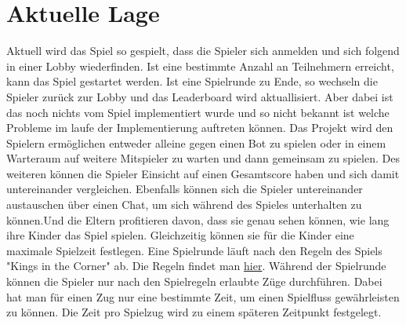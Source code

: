 \section{Aktuelle Lage}

Aktuell wird das Spiel so gespielt, dass die Spieler sich anmelden und sich folgend in einer Lobby wiederfinden. Ist eine bestimmte Anzahl an Teilnehmern erreicht, kann das Spiel gestartet werden. Ist eine Spielrunde zu Ende, so wechseln die Spieler zurück zur Lobby und das Leaderboard wird aktuallisiert. Aber dabei ist das noch nichts vom Spiel implementiert wurde und so nicht bekannt ist welche Probleme im laufe der Implementierung auftreten können. Das Projekt wird den Spielern ermöglichen entweder alleine gegen einen Bot zu spielen oder in einem Warteraum auf weitere Mitspieler zu warten und dann gemeinsam zu spielen. Des weiteren können die Spieler Einsicht auf einen Gesamtscore haben und sich damit untereinander vergleichen. Ebenfalls können sich die Spieler untereinander austauschen über einen Chat, um sich während des Spieles unterhalten zu können.Und die Eltern profitieren davon, dass sie genau sehen können, wie lang ihre Kinder das Spiel spielen. Gleichzeitig können sie für die Kinder eine maximale Spielzeit festlegen. Eine Spielrunde läuft nach den Regeln des Spiels "Kings in the Corner" ab. Die Regeln findet man \href{https://www.considerable.com/entertainment/card-games/kings-in-the-corner/}{hier}. Während der Spielrunde können die Spieler nur nach den Spielregeln erlaubte Züge durchführen. Dabei hat man für einen Zug nur eine bestimmte Zeit, um einen Spielfluss gewährleisten zu können. Die Zeit pro Spielzug wird zu einem späteren Zeitpunkt festgelegt.
